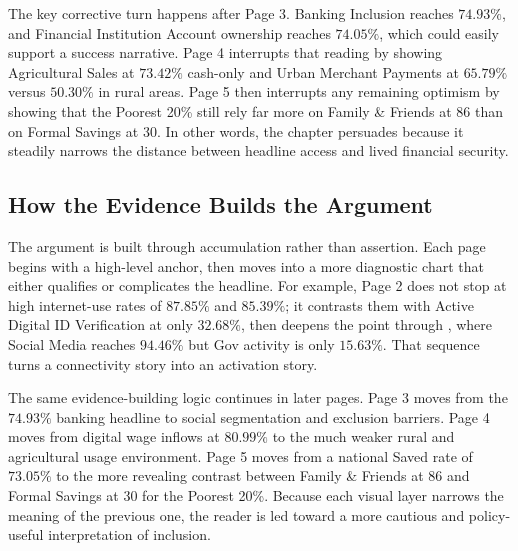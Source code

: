 \documentclass[../main.tex]{subfiles}
\begin{document}
The key corrective turn happens after Page 3. Banking Inclusion reaches
\(74.93\%\), and Financial Institution Account ownership reaches \(74.05\%\),
which could easily support a success narrative. Page 4 interrupts that reading
by showing Agricultural Sales at \(73.42\%\) cash-only and Urban Merchant
Payments at \(65.79\%\) versus \(50.30\%\) in rural areas. Page 5 then
interrupts any remaining optimism by showing that the Poorest 20\% still rely
far more on Family \& Friends at 86 than on Formal Savings at 30. In other
words, the chapter persuades because it steadily narrows the distance between
headline access and lived financial security.


\subsection{How the Evidence Builds the Argument}
\label{subsec:storytelling-principles}

The argument is built through accumulation rather than assertion. Each page
begins with a high-level anchor, then moves into a more diagnostic chart that
either qualifies or complicates the headline. For example, Page 2 does not stop
at high internet-use rates of \(87.85\%\) and \(85.39\%\); it contrasts them
with Active Digital ID Verification at only \(32.68\%\), then deepens the point
through , where Social Media
reaches \(94.46\%\) but Gov activity is only \(15.63\%\). That sequence turns a
connectivity story into an activation story.

The same evidence-building logic continues in later pages. Page 3 moves from
the \(74.93\%\) banking headline to social segmentation and exclusion barriers.
Page 4 moves from digital wage inflows at \(80.99\%\) to the much weaker rural
and agricultural usage environment. Page 5 moves from a national Saved rate of
\(73.05\%\) to the more revealing contrast between Family \& Friends at 86 and
Formal Savings at 30 for the Poorest 20\%. Because each visual layer narrows
the meaning of the previous one, the reader is led toward a more cautious and
policy-useful interpretation of inclusion.

\end{document}
